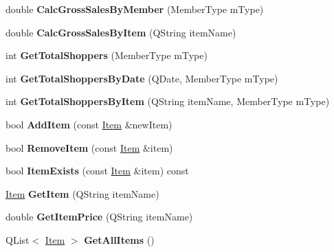 \begin{DoxyCompactItemize}
double {\bfseries Calc\+Gross\+Sales\+By\+Member} (Member\+Type m\+Type)
\item 
\mbox{\label{class_d_b_manager_a9a1a8f5fad0dce3381baeefcd02acf4f}} 
double {\bfseries Calc\+Gross\+Sales\+By\+Item} (Q\+String item\+Name)
\item 
\mbox{\label{class_d_b_manager_a582912a647136bf2da053535070cfcce}} 
int {\bfseries Get\+Total\+Shoppers} (Member\+Type m\+Type)
\item 
\mbox{\label{class_d_b_manager_add65a1ed937a4f8ed0bb3aada12f00c0}} 
int {\bfseries Get\+Total\+Shoppers\+By\+Date} (Q\+Date, Member\+Type m\+Type)
\item 
\mbox{\label{class_d_b_manager_a3865bcd00fd7fe0a0b53d258044960a7}} 
int {\bfseries Get\+Total\+Shoppers\+By\+Item} (Q\+String item\+Name, Member\+Type m\+Type)
\item 
\mbox{\label{class_d_b_manager_ada82cd13fd36808cb0a47aa3fd1f85e2}} 
bool {\bfseries Add\+Item} (const \mbox{\hyperlink{class_item}{Item}} \&new\+Item)
\item 
\mbox{\label{class_d_b_manager_ae8eb0099d4749c691d243ac5ca806c30}} 
bool {\bfseries Remove\+Item} (const \mbox{\hyperlink{class_item}{Item}} \&item)
\item 
\mbox{\label{class_d_b_manager_aef56b936402215d9e4675c7688160e35}} 
bool {\bfseries Item\+Exists} (const \mbox{\hyperlink{class_item}{Item}} \&item) const
\item 
\mbox{\label{class_d_b_manager_a54eaafb835b4d8ae4f205419c1b8c1d2}} 
\mbox{\hyperlink{class_item}{Item}} {\bfseries Get\+Item} (Q\+String item\+Name)
\item 
\mbox{\label{class_d_b_manager_a6c5953c6e821792f2b720a0913c492b5}} 
double {\bfseries Get\+Item\+Price} (Q\+String item\+Name)
\item 
\mbox{\label{class_d_b_manager_a9a493b6c8e195842cc287cc3338bcd16}} 
Q\+List$<$ \mbox{\hyperlink{class_item}{Item}} $>$ {\bfseries Get\+All\+Items} ()

\end{DoxyCompactItemize}
